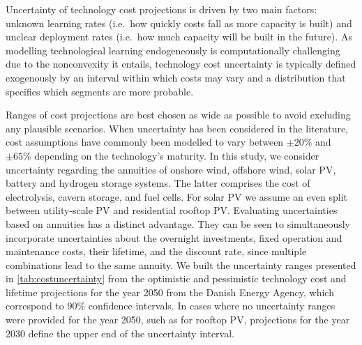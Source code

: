Uncertainty of technology cost projections is driven by two main factors:
unknown learning rates (i.e.~how quickly costs fall as more capacity is built) and
unclear deployment rates (i.e.~how much capacity will be built in the future).\cite{gritsevskyi_modeling_2000,yeh_review_2012}
As modelling technological learning endogeneously is computationally challenging due to the nonconvexity it entails,\cite{heuberger_power_2017,mattsson_learning_2019,lisa_learning2022}
technology cost uncertainty is typically defined exogenously by an interval within which costs may vary
and a distribution that specifies which segments are more probable.


Ranges of cost projections are best chosen as wide as possible to avoid
excluding any plausible scenarios.
\cite{moret_characterization_2017,mccollum_energy_2020} When uncertainty has
been considered in the literature, cost assumptions have commonly been modelled
to vary between $\pm20\%$ and $\pm65\%$ depending on the technology's maturity.
\cite{moret_characterization_2017,shirizadeh_how_2019,pizarro-alonso_uncertainties_2019,li_using_2020,trondle_trade-offs_2020}
In this study, we consider uncertainty regarding the annuities of onshore wind,
offshore wind, solar PV, battery and hydrogen storage systems. The latter
comprises the cost of electrolysis, cavern storage, and fuel cells. For solar PV
we assume an even split between utility-scale PV and residential rooftop PV.
Evaluating uncertainties based on annuities has a distinct advantage. They can
be seen to simultaneously incorporate uncertainties about the overnight
investments, fixed operation and maintenance costs, their lifetime, and the
discount rate, since multiple combinations lead to the same annuity. We built
the uncertainty ranges presented in \cref{tab:costuncertainty} from the
optimistic and pessimistic technology cost and lifetime projections for the year
2050 from the Danish Energy Agency, which correspond to 90\% confidence
intervals.\cite{DEA} In cases where no uncertainty ranges were provided
for the year 2050, such as for rooftop PV, projections for the year 2030
define the upper end of the uncertainty interval.


